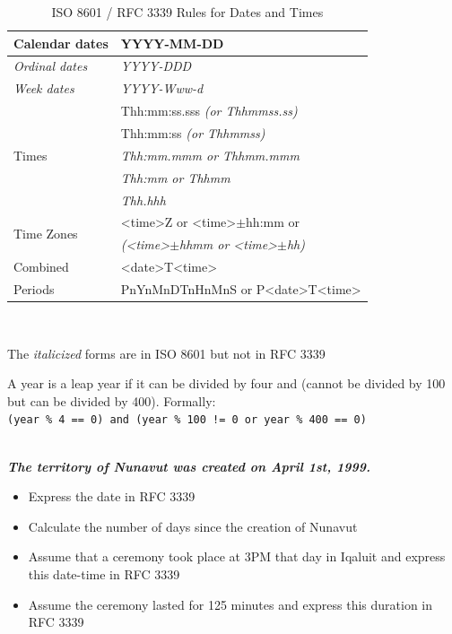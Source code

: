 \begin{table}
\centering
\renewcommand{\arraystretch}{1.25}

\begin{tabular}{l|l} \hline
	Calendar dates & YYYY-MM-DD  \\ \hline
	\textit{Ordinal dates} & \textit{YYYY-DDD} \\ \hline
	\textit{Week dates} & \textit{YYYY-Www-d} \\ \hline
	\multirow{5}{*}{Times} & Thh:mm:ss.sss \textit{(or Thhmmss.ss)} \\
	& Thh:mm:ss \textit{(or Thhmmss)} \\
	& \textit{Thh:mm.mmm or Thhmm.mmm} \\
	& \textit{Thh:mm or Thhmm} \\
	& \textit{Thh.hhh} \\ \hline
	\multirow{2}{*}{Time Zones} & <time>Z or <time>$\pm$hh:mm or \\
	& \textit{(<time>$\pm$hhmm or <time>$\pm$hh)} \\ \hline
	Combined & <date>T<time> \\
	Periods & PnYnMnDTnHnMnS or P<date>T<time> \\ \hline
\end{tabular} \\ \vspace{.5\baselineskip}

\small The \textit{italicized} forms are in ISO 8601 but not in RFC 3339
\caption{ISO 8601 / RFC 3339 Rules for Dates and Times}
\label{tab:iso8601}
\end{table}

\begin{infobox}
A year is a leap year if it can be divided by four and (cannot be divided by 100 but can be divided by 400). Formally: \\
\small
\texttt{(year \% 4 == 0) and (year \% 100 != 0 or year \% 400 == 0)}
\normalsize
\end{infobox}
 
\begin{exerciseboxpaper}

\textit{\textbf{\vspace{3mm} \\The territory of Nunavut was created on April 1st, 1999. \vspace{3mm}}}

\begin{itemize}
	\item Express the date in RFC 3339
	\item Calculate the number of days since the creation of Nunavut
	\item Assume that a ceremony took place at 3PM that day in Iqaluit and express this date-time in RFC 3339
	\item Assume the ceremony lasted for 125 minutes and express this duration in RFC 3339
\end{itemize}
\end{exerciseboxpaper}

